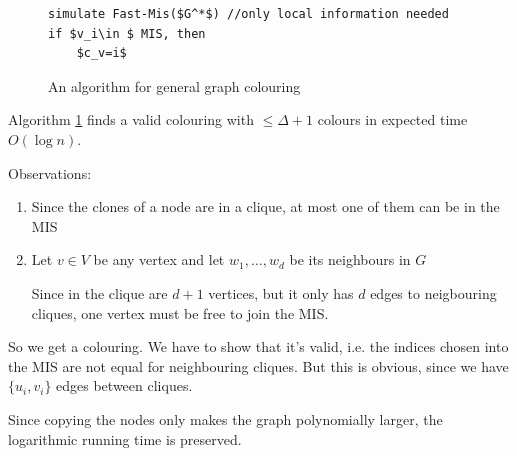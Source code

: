 \begin{figure}[hbt]
\begin{lstlisting}
simulate Fast-Mis($G^*$) //only local information needed
if $v_i\in $ MIS, then
	$c_v=i$ 
\end{lstlisting}
\caption{An algorithm for general graph colouring}
\label{alg:general_colouring}
\end{figure}

\begin{thm} Algorithm \ref{alg:general_colouring} finds a valid colouring with $\leq \Delta+1$ colours in expected time $O(\log n)$.\end{thm}

\begin{pr} Observations:

\begin{enumerate}
\item Since the clones of a node are in a clique, at most one of them can be in the MIS
\item Let $v\in V$ be any vertex and let $w_1,\ldots,w_d$ be its neighbours in $G$

Since in the clique are $d+1$ vertices, but it only has $d$ edges to neigbouring cliques, one vertex must be free to join the MIS.

\end{enumerate}

So we get a colouring. We have to show that it's valid, i.e. the indices chosen into the MIS are not equal for neighbouring cliques. But this is obvious, since we have $\{u_i,v_i\}$ edges between cliques.

Since copying the nodes only makes the graph polynomially larger, the logarithmic running time is preserved.
\end{pr}